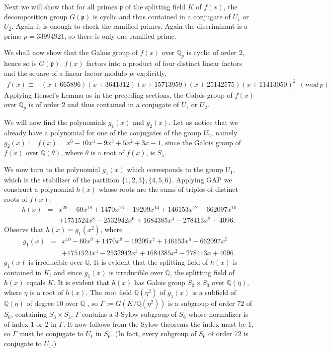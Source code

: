 \documentclass[reqno,12pt]{amsart}
\theoremstyle{remark}
\theoremstyle{definition}
\theoremstyle{citing}
\numberwithin{theorem}{section}
\numberwithin{equation}{section}
\begin{document}
Next we will show that for all primes $\mathfrak{p}$ of the splitting field $K$ of $f(x)$, the
decomposition group $G(\mathfrak{p})$ is cyclic and thus contained
in a conjugate of $U_{1}$ or $U_{2}$. Again it is enough to check the ramified
primes. Again the discriminant is a prime $p=33994921$,  so there is only one ramified prime.

We shall now show that the Galois group of $f(x)$ over $\mathbb{Q}_{p}$
is cyclic of order 2, hence so is $G(\mathfrak{p})$. $f(x)$ factors into a product of four distinct linear
factors and the square of a linear factor  modulo $p$; explicitly,
 \begin{eqnarray*}
f(x)\equiv & (x+665896)(x+3641312)(x+15713959)(x+25142575)(x+11413050)^{2}\ \ (mod\ p)\end{eqnarray*}
Applying Hensel's Lemma as in the preceding sections, the Galois group of $f(x)$ over $\mathbb{Q}_{p}$
is of order 2 and thus contained in a conjugate of $U_{1}$ or $U_{2}$.

We will now find the polynomials $g_{1}(x)$ and $g_{2}(x)$. Let
us notice that we already have a polynomial for one of the conjugates
of the group $U_{2}$, namely $g_{2}(x):=f(x)=x^{6}-10x^{4}-9x^{3}+5x^{2}+3x-1$,
 since the Galois group of $f(x)$ over $\mathbb{Q}(\theta)$,
where $\theta$ is a root of $f(x)$, is $S_{5}$.

We now turn to the polynomial $g_{1}(x)$ which corresponds to the group $U_{1}$,
 which
is the stabilizer of the partition $\{1,2,3\},\{4,5,6\}$.
Applying GAP we
construct a polynomial $h(x)$ whose roots are the sums of triples of distinct roots of $f(x)$:
\begin{eqnarray*}
h(x) & = & x^{20}-60x^{18}+1470x^{16}-19209x^{14}+146153x^{12}-662097x^{10}\\
 &  & +1751524x^{8}-2532942x^{6}+1684385x^{4}-278413x^{2}+4096.\end{eqnarray*}
Observe that $h(x)=g_1(x^2)$, where
  \begin{eqnarray*}
g_{1}(x) & = & x^{10}-60x^{9}+1470x^{8}-19209x^{7}+146153x^{6}-662097x^{5}\\
 &  & +1751524x^{4}-2532942x^{3}+1684385x^{2}-278413x+4096.\end{eqnarray*}
 $g_{1}(x)$ is irreducible over $\mathbb{Q}$.
It is evident that the splitting field of $h(x)$ is contained in
$K$, and since $g_{1}(x)$ is irreducible over ${{\mathbb{{Q}}}}$, the splitting field of $h(x)$ equals $K$.
It is evident that $h(x)$
 has Galois group $S_{3}\times S_{3}$
over $\mathbb{Q}(\eta)$, where $\eta$ is a root of $h(x)$.
The root field $\mathbb{Q}(\eta^2)$
of $g_{1}(x)$ is a subfield of $\mathbb{Q}(\eta)$ of degree $10$ over $\mathbb{Q}$
, so $\Gamma:=G(K/\mathbb{Q}(\eta^2))$ is a subgroup of order $72$ of $S_{6}$, containing $S_{3}\times S_{3}$.
$\Gamma$ contains a 3-Sylow subgroup of $S_6$ whose normalizer is of index 1 or 2 in $\Gamma$.  It now follows from the Sylow theorems the index must be 1, so $\Gamma$ must be conjugate to $U_1$ in $S_6$.  (In fact, every subgroup of $S_6$ of order 72 is conjugate to $U_1$.)
\end{document}
